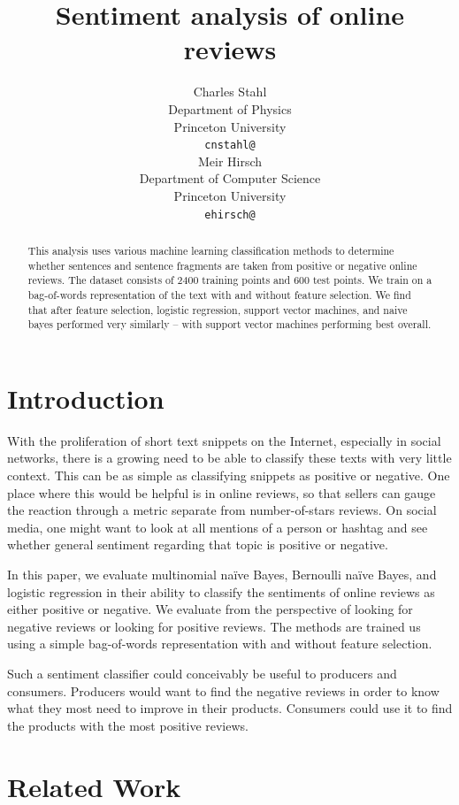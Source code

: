 \documentclass{article} %
\title{Sentiment analysis of online reviews}
\author{
	Charles Stahl\\
	Department of Physics\\
	Princeton University\\
	\texttt{cnstahl@} \\
	\And
	Meir Hirsch \\
	Department of Computer Science\\
	Princeton University \\
	\texttt{ehirsch@} \\
}
\begin{document}
	
	\maketitle
	
	\begin{abstract}
	This analysis uses various machine learning classification methods to determine whether sentences and sentence fragments are taken from positive or negative online reviews. The dataset consists of 2400 training points and 600 test points. We train on a bag-of-words representation of the text with and without feature selection. We find that after feature selection, logistic regression, support vector machines, and naive bayes performed very similarly – with support vector machines performing best overall. 
	\end{abstract}
	
	\section{Introduction}
	
	With the proliferation of short text snippets on the Internet, especially in social networks, there is a growing need to be able to classify these texts with very little context. This can be as simple as classifying snippets as positive or negative. One place where this would be helpful is in online reviews, so that sellers can gauge the reaction through a metric separate from number-of-stars reviews. On social media, one might want to look at all mentions of a person or hashtag and see whether general sentiment regarding that topic is positive or negative.
	
	In this paper, we evaluate multinomial na\"ive Bayes, Bernoulli na\"ive Bayes, and logistic regression in their ability to classify the sentiments of online reviews as either positive or negative. We evaluate from the perspective of looking for negative reviews or looking for positive reviews. The methods are trained us using a simple bag-of-words representation with and without feature selection. 
	
	Such a sentiment classifier could conceivably be useful to producers and consumers. Producers would want to find the negative reviews in order to know what they most need to improve in their products. Consumers could use it to find the products with the most positive reviews.
	
	\section{Related Work}
	
\end{document}
